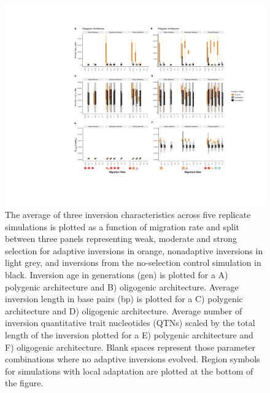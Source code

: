 \documentclass[10pt, scrartlc]{article}
\begin{document}
\clearpage
\newpage

\begin{figure}[h]
	\begin{center}
		\includegraphics[width = 6.5 in]{Fig3_characteristics.pdf}
	\end{center}
	\caption[Inversion Characteristics]{The average of three inversion characteristics across five replicate simulations is plotted as a function of migration rate and split between three panels representing weak, moderate and strong selection for adaptive inversions in orange, nonadaptive inversions in light grey, and inversions from the no-selection control simulation in black. Inversion age in generations (gen) is plotted for a A) polygenic architecture and B) oligogenic architecture. Average inversion length in base pairs (bp) is plotted for a C) polygenic architecture and D) oligogenic architecture. Average number of inversion quantitative trait nucleotides (QTNs) scaled by the total length of the inversion plotted for a E) polygenic architecture and F) oligogenic architecture. Blank spaces represent those parameter combinations where no adaptive inversions evolved. Region symbols for simulations with local adaptation are plotted at the bottom of the figure. }
\end{figure}

\clearpage
\newpage
\end{document}
